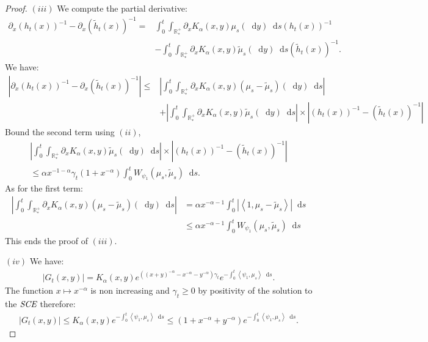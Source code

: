 \documentclass[11pt,a4paper]{article}
\newcommand{\RRP}{\mathbb{R}^+_*}
\newcommand{\SCE}{\emph{SCE}}
\newcommand{\brac}[1]{\left\langle#1\right\rangle}
\newcommand{\dd}{\mathop{}\!\mathrm{d}}
\begin{document}
\begin{proof}
    $(iii)$ We compute the partial derivative:
    \begin{align*}
        \partial_x \left( h_t(x)\right)^{-1}- \partial_x\left( \tilde{h}_t(x)\right)^{-1} =& \int_0^t \int_{\RRP} \partial_x K_\alpha(x,y) \mu_s(\dd y) \dd s \left( h_t(x)\right)^{-1} \\
        &- \int_0^t \int_{\RRP} \partial_x K_\alpha(x,y) \tilde{\mu}_s(\dd y) \dd s \left( \tilde{h}_t(x)\right)^{-1}.
    \end{align*}
    We have:
    \begin{align*}
        \left|\partial_x \left( h_t(x)\right)^{-1}- \partial_x\left( \tilde{h}_t(x)\right)^{-1} \right| \leq& \left|\int_0^t \int_{\RRP} \partial_x K_\alpha(x,y) \left( \mu_s - \tilde{\mu}_s\right)(\dd y) \dd s\right| \\
        &+ \left|\int_0^t \int_{\RRP} \partial_x K_\alpha(x,y) \tilde{\mu}_s(\dd y) \dd s\right| \times \left|\left( h_t(x)\right)^{-1}-\left( \tilde{h}_t(x)\right)^{-1} \right|
    \end{align*}
    Bound the second term using $(ii)$,
    \begin{multline*}
        \left|\int_0^t \int_{\RRP} \partial_x K_\alpha(x,y) \tilde{\mu}_s(\dd y) \dd s\right| \times \left|\left( h_t(x)\right)^{-1}-\left( \tilde{h}_t(x)\right)^{-1} \right| \\
        \leq \alpha x^{-1-\alpha} \gamma_t (1 + x^{-\alpha})\int_0^t W_{\psi_1}\left(\mu_s,\tilde{\mu}_s \right)\dd s.
    \end{multline*}
    As for the first term:
    \begin{align*}
        \left|\int_0^t \int_{\RRP} \partial_x K_\alpha(x,y) \left( \mu_s - \tilde{\mu}_s\right)(\dd y) \dd s\right| 
        &= \alpha x^{-\alpha-1} \int_0^t \left|\brac{1,\mu_s - \tilde{\mu}_s}\right| \dd s\\
        &\leq \alpha x^{-\alpha-1}\int_0^t W_{\psi_1} (\mu_s,\tilde{\mu}_s)\dd s
    \end{align*}
    This ends the proof of $(iii)$.

    $(iv)$ We have:
    \begin{align*}
        \left|G_t(x,y)\right| = K_\alpha(x,y) e^{\left((x+y)^{-\alpha} - x^{-\alpha}- y^{-\alpha}\right)\gamma_t} e^{-\int_0^t \brac{\psi_1,\mu_s}\dd s}.
    \end{align*}
    The function $x \mapsto x^{-\alpha}$ is non increasing and $\gamma_t \geq 0$ by positivity of the solution to the $\SCE$ therefore:
    \begin{align*}
        \left|G_t(x,y)\right| \leq K_\alpha(x,y)e^{-\int_0^t \brac{\psi_1,\mu_s}\dd s} \leq (1 + x^{-\alpha} + y^{-\alpha})e^{-\int_0^t \brac{\psi_1,\mu_s}\dd s}.
    \end{align*}


\end{proof}
\end{document}
